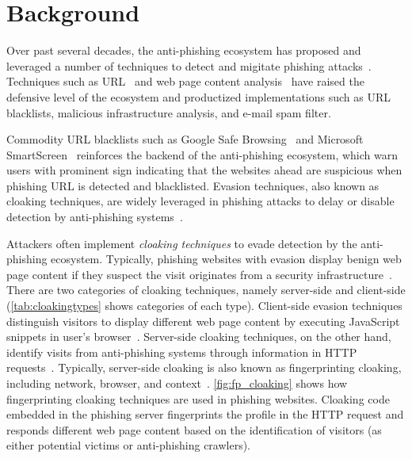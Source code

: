\section{Background}
\label{s:background}

\cloakingTypes



Over past several decades, the anti-phishing ecosystem has proposed and leveraged a number of techniques to detect and migitate phishing attacks~\cite{oest2018inside}.
Techniques such as URL~\cite{bin2010dns, blum2010lexical, huang2012svm, khonji2011novel} and web page content analysis~\cite{wu2006web, zhang2007cantina, zhang2011textual, bilge2011exposure, canali2013role} have raised the defensive level of the ecosystem and productized implementations such as URL blacklists, malicious infrastructure analysis, and e-mail spam filter.

Commodity URL blacklists such as Google Safe Browsing~\cite{whittaker2010large} and Microsoft SmartScreen~\cite{smartscreen} reinforces the backend of the anti-phishing ecosystem, which warn users with prominent sign indicating that the websites ahead are suspicious when phishing URL is detected and blacklisted.
Evasion techniques, also known as cloaking techniques, are widely leveraged in phishing attacks to delay or disable detection by anti-phishing systems~\cite{liang2016cracking, oest2019phishfarm, oest20phishtime}.



Attackers often implement \emph{cloaking techniques} to evade detection by the anti-phishing ecosystem.
Typically, phishing websites with evasion display benign web page content if they suspect the visit originates from a security infrastructure~\cite{wu2005cloaking}.
There are two categories of cloaking techniques, namely server-side and client-side (\autoref{tab:cloakingtypes} shows categories of each type).
Client-side evasion techniques distinguish visitors to display different web page content by executing JavaScript snippets in user's browser~\cite{zhang2021crawlphish}.
Server-side cloaking techniques, on the other hand, identify visits from anti-phishing systems through information in HTTP requests~\cite{oest2018inside, invernizzi2016cloak}.
Typically, server-side cloaking is also known as fingerprinting cloaking, including network, browser, and context~\cite{invernizzi2016cloak}.
\autoref{fig:fp_cloaking} shows how fingerprinting cloaking techniques are used in phishing websites.
Cloaking code embedded in the phishing server fingerprints the profile in the HTTP request and responds different web page content based on the identification of visitors (as either potential victims or anti-phishing crawlers).

